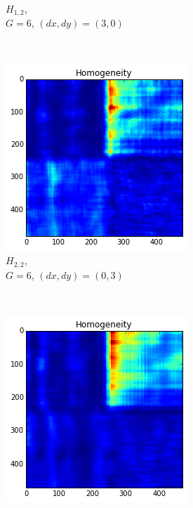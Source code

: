 \documentclass[a4paper]{article}
\begin{document}
\begin{figure}
\begin{subfigure}[b]{0.30\textwidth}
        \caption{%
            $H_{1,2}$, \\
            $G=6$, $(dx, dy)=(3,0)$
        }
        \label{fig:h12}
    \end{subfigure}
    ~
    \begin{subfigure}[b]{0.30\textwidth}
        \centering
        \includegraphics[width=\textwidth]{hom22.png}
        \caption{%
            $H_{2,2}$, \\
            $G=6$, $(dx, dy)=(0,3)$
        }
        \label{fig:h22}
    \end{subfigure}
    ~
    \begin{subfigure}[b]{0.30\textwidth}
        \centering
        \includegraphics[width=\textwidth]{hom32.png}

\end{subfigure}
\end{figure}
\end{document}
